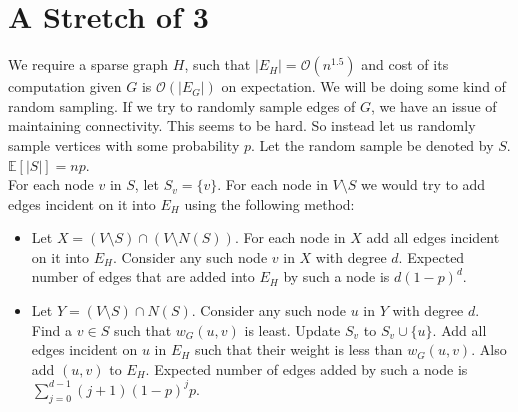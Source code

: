\documentclass[12pt]{article}
\begin{document}
\section{A Stretch of 3}
We require a sparse graph $H$, such that $|E_H| = \mathcal{O}(n^{1.5})$ and cost of its computation given $G$ is $\mathcal{O}(|E_G|)$ on expectation.
We will be doing some kind of random sampling. If we try to randomly sample edges of $G$, we have an issue of maintaining connectivity. This seems to be hard.
So instead let us randomly sample vertices with some probability $p$. Let the random sample be denoted by $S$. $\mathbb{E}[|S|] = np$.
\\
For each node $v$ in $S$, let $S_v = \{ v \}$. For each node in $V \setminus S$ we would try to add edges incident on it into $E_H$ using the following method:
\begin{itemize}
  \item Let $X = (V \setminus S) \cap (V \setminus N(S))$. For each node in $X$ add all edges incident on it into $E_H$. Consider any such node $v$ in $X$ with degree $d$. Expected number of edges that are added into $E_H$ by such a node is $d(1 - p)^{d}$.
  \item Let $Y = (V \setminus S) \cap N(S)$. Consider any such node $u$ in $Y$ with degree $d$. Find a $v \in S$ such that $w_G(u, v)$ is least. Update $S_v$ to $S_v \cup \{ u \}$.
  Add all edges incident on $u$ in $E_H$ such that their weight is less than $w_G(u, v)$. Also add $(u, v)$ to $E_H$.
  Expected number of edges added by such a node is $\sum_{j = 0}^{d - 1}(j + 1)(1 - p)^{j}p$.
\end{itemize}
\end{document}
